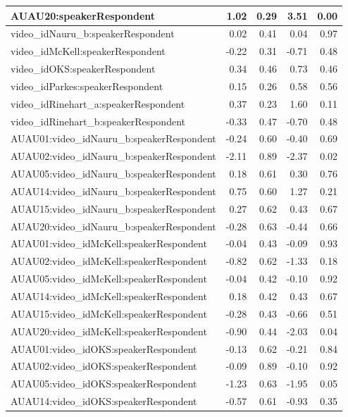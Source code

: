 \documentclass{monashthesis}
\begin{document}
\begin{tabular}{l|r|r|r|r}
\hline
AUAU20:speakerRespondent & 1.02 & 0.29 & 3.51 & 0.00\\
\hline
video\_idNauru\_b:speakerRespondent & 0.02 & 0.41 & 0.04 & 0.97\\
\hline
video\_idMcKell:speakerRespondent & -0.22 & 0.31 & -0.71 & 0.48\\
\hline
video\_idOKS:speakerRespondent & 0.34 & 0.46 & 0.73 & 0.46\\
\hline
video\_idParkes:speakerRespondent & 0.15 & 0.26 & 0.58 & 0.56\\
\hline
video\_idRinehart\_a:speakerRespondent & 0.37 & 0.23 & 1.60 & 0.11\\
\hline
video\_idRinehart\_b:speakerRespondent & -0.33 & 0.47 & -0.70 & 0.48\\
\hline
AUAU01:video\_idNauru\_b:speakerRespondent & -0.24 & 0.60 & -0.40 & 0.69\\
\hline
AUAU02:video\_idNauru\_b:speakerRespondent & -2.11 & 0.89 & -2.37 & 0.02\\
\hline
AUAU05:video\_idNauru\_b:speakerRespondent & 0.18 & 0.61 & 0.30 & 0.76\\
\hline
AUAU14:video\_idNauru\_b:speakerRespondent & 0.75 & 0.60 & 1.27 & 0.21\\
\hline
AUAU15:video\_idNauru\_b:speakerRespondent & 0.27 & 0.62 & 0.43 & 0.67\\
\hline
AUAU20:video\_idNauru\_b:speakerRespondent & -0.28 & 0.63 & -0.44 & 0.66\\
\hline
AUAU01:video\_idMcKell:speakerRespondent & -0.04 & 0.43 & -0.09 & 0.93\\
\hline
AUAU02:video\_idMcKell:speakerRespondent & -0.82 & 0.62 & -1.33 & 0.18\\
\hline
AUAU05:video\_idMcKell:speakerRespondent & -0.04 & 0.42 & -0.10 & 0.92\\
\hline
AUAU14:video\_idMcKell:speakerRespondent & 0.18 & 0.42 & 0.43 & 0.67\\
\hline
AUAU15:video\_idMcKell:speakerRespondent & -0.28 & 0.43 & -0.66 & 0.51\\
\hline
AUAU20:video\_idMcKell:speakerRespondent & -0.90 & 0.44 & -2.03 & 0.04\\
\hline
AUAU01:video\_idOKS:speakerRespondent & -0.13 & 0.62 & -0.21 & 0.84\\
\hline
AUAU02:video\_idOKS:speakerRespondent & -0.09 & 0.89 & -0.10 & 0.92\\
\hline
AUAU05:video\_idOKS:speakerRespondent & -1.23 & 0.63 & -1.95 & 0.05\\
\hline
AUAU14:video\_idOKS:speakerRespondent & -0.57 & 0.61 & -0.93 & 0.35\\

\end{tabular}
\end{document}
